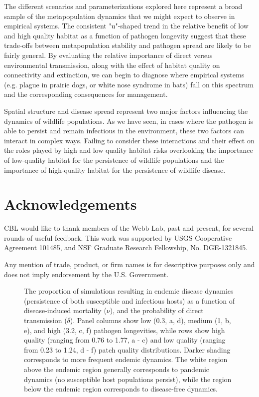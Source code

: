 \documentclass{article}
\begin{document}
The different scenarios and parameterizations explored here represent a broad sample of the metapopulation dynamics that we might expect to observe in empirical systems.  The consistent "u"-shaped trend in the relative benefit of low and high quality habitat as a function of pathogen longevity suggest that these trade-offs between metapopulation stability and pathogen spread are likely to be fairly general.  By evaluating the relative importance of direct versus environmental transmission, along with the effect of habitat quality on connectivity and extinction, we can begin to diagnose where empirical systems (e.g. plague in prairie dogs, or white nose syndrome in bats) fall on this spectrum and the corresponding consequences for management.

Spatial structure and disease spread represent two major factors influencing the dynamics of wildlife populations.  As we have seen, in cases where the pathogen is able to persist and remain infectious in the environment, these two factors can interact in complex ways.  Failing to consider these interactions and their effect on the roles played by high and low quality habitat risks overlooking the importance of low-quality habitat for the persistence of wildlife populations and the importance of high-quality habitat for the persistence of wildlife disease.

\section{Acknowledgements}

CBL would like to thank members of the Webb Lab, past and present, for several rounds of useful feedback.  This work was supported by USGS Cooperative Agreement 101485, and NSF Graduate Research Fellowship, No. DGE-1321845.

Any mention of trade, product, or firm names is for descriptive purposes only and does not imply endorsement by the U.S. Government.

\clearpage

     

\clearpage

\begin{figure}
\caption{The proportion of simulations resulting in endemic disease dynamics (persistence of both susceptible and infectious hosts) as a function of disease-induced mortality ($\nu$), and the probability of direct transmission ($\delta$).  Panel columns show low (0.3, a, d), medium (1, b, e), and high (3.2, c, f) pathogen longevities, while rows show high quality (ranging from 0.76 to 1.77, a - c) and low quality (ranging from 0.23 to 1.24, d - f) patch quality distributions.  Darker shading corresponds to more frequent endemic dynamics.  The white region above the endemic region generally corresponds to pandemic dynamics (no susceptible host populations persist), while the region below the endemic region corresponds to disease-free dynamics.}
\label{endemic}
\end{figure}
\end{document}
